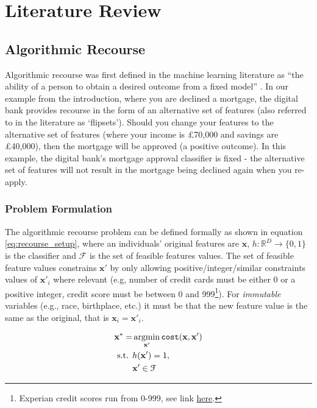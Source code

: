 \chapter{Literature Review} \label{chapter:lit_review}

\section{Algorithmic Recourse}

Algorithmic recourse was first defined in the machine learning literature as ``the ability of a person to obtain a desired outcome from a fixed model'' \citep{ustunActionableRecourseLinear2019}. In our example from the introduction, where you are declined a mortgage, the digital bank provides recourse in the form of an alternative set of features (also referred to in the literature as `flipsets'). Should you change your features to the alternative set of features (where your income is £70,000 and savings are £40,000), then the mortgage will be approved (a positive outcome). In this example, the digital bank's mortgage approval classifier is fixed - the alternative set of features will not result in the mortgage being declined again when you re-apply.


\subsection{Problem Formulation}
The algorithmic recourse problem can be defined formally as shown in equation \ref{eq:recourse_setup}, where an individuals' original features are $\mathbf{x}$, $h: \mathbb{R}^D \to \{0,1\}$ is the classifier and $\mathcal{F}$ is the set of feasible features values. The set of feasible feature values constrains $\mathbf{x}'$ by only allowing positive/integer/similar constraints values of $\mathbf{x}'_i$ where relevant (e.g, number of credit cards must be either 0 or a positive integer, credit score must be between 0 and 999\footnote{Experian credit scores run from 0-999, see link \href{https://www.experian.co.uk/consumer/experian-credit-score.html}{here}.}). For \textit{immutable} variables (e.g., race, birthplace, etc.) it must be that the new feature value is the same as the original, that is $\mathbf{x}_i=\mathbf{x}'_i$.

\begin{align} \label{eq:recourse_setup}
	\mathbf{x}^* = & \operatorname*{argmin}_{\mathbf{x}'}  \operatorname*{\texttt{cost}}(\mathbf{x}, \mathbf{x}') \\ \nonumber
	\text{s.t. } & h(\mathbf{x}') = 1, \\ \nonumber
	& \mathbf{x}' \in \mathcal{F}
\end{align}

